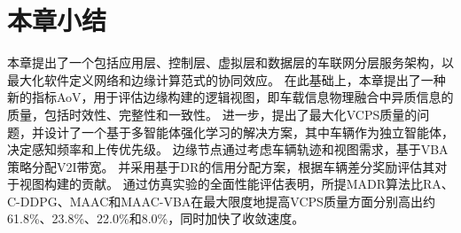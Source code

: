 \section{本章小结}\label{section 2-7}

本章提出了一个包括应用层、控制层、虚拟层和数据层的车联网分层服务架构，以最大化软件定义网络和边缘计算范式的协同效应。
在此基础上，本章提出了一种新的指标AoV，用于评估边缘构建的逻辑视图，即车载信息物理融合中异质信息的质量，包括时效性、完整性和一致性。
进一步，提出了最大化VCPS质量的问题，并设计了一个基于多智能体强化学习的解决方案，其中车辆作为独立智能体，决定感知频率和上传优先级。
边缘节点通过考虑车辆轨迹和视图需求，基于VBA策略分配V2I带宽。
并采用基于DR的信用分配方案，根据车辆差分奖励评估其对于视图构建的贡献。
通过仿真实验的全面性能评估表明，所提MADR算法比RA、C-DDPG、MAAC和MAAC-VBA在最大限度地提高VCPS质量方面分别高出约61.8\%、23.8\%、22.0\%和8.0\%，同时加快了收敛速度。